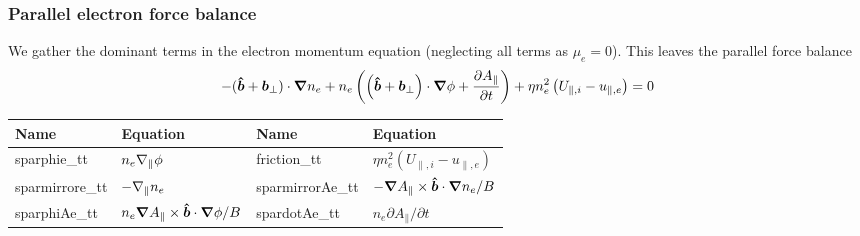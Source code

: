 \subsubsection{Parallel electron force balance}
We gather the dominant terms in the electron momentum equation (neglecting all terms as $\mu_e=0$). This leaves the parallel force balance
\begin{align}
    -(\bm{\hat{b}} + {\boldsymbol{b}}_\perp) \cdot{\boldsymbol{\nabla}} n_e +n_e\left( \left( \bm{\hat{b}} + {\boldsymbol{b}}_\perp \right) \cdot{\boldsymbol{\nabla}} \phi + \frac{\partial A_\parallel}{\partial t} \right) +\eta n_e^2 \left( U_{\parallel,i} - u_{\parallel,e}\right) = 0
\end{align}
\begin{longtable}{llll}
\toprule
\rowcolor{gray!50}\textbf{Name} &  \textbf{Equation} &
\textbf{Name} &  \textbf{Equation}\\
\midrule
    sparphie\_tt & $n_e\nabla_\parallel \phi$ &
    friction\_tt & $ \eta n_e^2(U_{\parallel,i}-u_{\parallel,e})$ \\
    sparmirrore\_tt & $-\nabla_\parallel n_e$ &
    sparmirrorAe\_tt & $-{\boldsymbol{\nabla}} A_\parallel \times \bm{\hat{b}} \cdot{\boldsymbol{\nabla}} n_e /B$ \\
    sparphiAe\_tt & $n_e {\boldsymbol{\nabla}} A_\parallel \times \bm{\hat{b}} \cdot{\boldsymbol{\nabla}} \phi /B$ &
    spardotAe\_tt & $ n_e \partial A_\parallel /\partial t$ \\
\bottomrule
\end{longtable}





